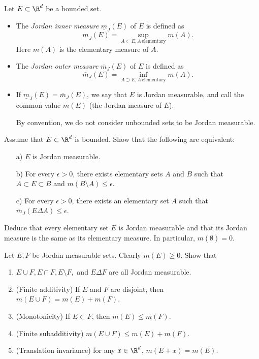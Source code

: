 \documentclass[lang=cn,11pt]{template}
\begin{document}
 Let $E \subset \R^d$ be a bounded set. 
 \begin{itemize}
 \item The \emph{Jordan inner measure} $\underline m_J(E)$ of $E$ is defined as 
 $$
 \underline m_J(E)=\sup_{A\subset E, A\,  \textrm{elementary}} m(A).
 $$
 Here $m(A)$ is the elementary measure of $A$.
 
 \item The \emph{Jordan outer measure} $\overline m_J(E)$ of $E$ is defined as 
 $$
 \overline m_J(E)=\inf_{A\supset E, A\,  \textrm{elementary}} m(A).
 $$
\item If $\underline m_J(E)=\overline m_J(E)$, we say that $E$ is Jordan measurable, and call the common value $m(E)$ (the Jordan measure of $E$).

By convention, we do not consider unbounded sets to be Jordan measurable.  
\end{itemize}


 Assume that $E \subset \R^d$ is bounded. Show that the following are equivalent:
 \begin{enumerate}
 \item[a)] $E$ is Jordan measurable. 
 \item[b)] For every $\epsilon>0$, there exists elementary sets $A$ and $B$ such that $A\subset E \subset B$ and $m(B\setminus A)\leq \epsilon$.
 \item[c)] For every $\epsilon>0$, there exists an elementary set $A$ such that $\overline m_J(E\Delta A)\leq \epsilon$.
 \end{enumerate}

 Deduce that every elementary set $E$ is Jordan measurable and that its Jordan measure is the same as its elementary measure. In particular, $m(\emptyset)=0$.


 Let $E, F$ be Jordan measurable sets.  Clearly $m(E) \geq 0$. Show that 
\begin{enumerate}
\item  $E\cup F, E\cap F, E\setminus F, $ and $E\Delta F$ are all Jordan measurable. 
\item (Finite additivity) If $E$ and $F$ are disjoint, then $m(E\cup F)=m(E)+m(F)$.
\item (Monotonicity) If $E \subset F$, then $m(E)\leq m(F)$. 
\item (Finite subadditivity) $m(E\cup F) \leq m(E)+m(F)$. 
\item (Translation invariance) for any $x\in \R^d$, $m(E+x)=m(E)$.
 \end{enumerate}
\end{document}
